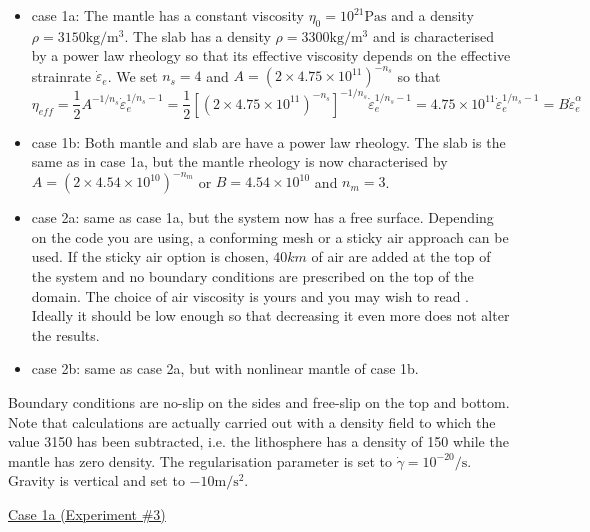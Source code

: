 \begin{itemize}
\item case 1a: 
The mantle has a constant viscosity $\eta_0=10^{21}\si{\pascal\second}$ and a density 
$\rho=3150\si{\kilogram\per\cubic\metre}$. 
The slab has a density $\rho=3300\si{\kilogram\per\cubic\metre}$ 
and is characterised by a power law rheology so that 
its effective viscosity depends on the effective strainrate $\dot\varepsilon_e$.
We set $n_s=4$ and $A=(2 \times 4.75\!\times\! 10^{11})^{-n_s}$ so that 
\begin{equation}
\eta_{eff}
=\frac{1}{2} A^{-1/n_s} \dot\varepsilon_e^{1/n_s-1} 
=\frac{1}{2} [(2 \times 4.75\!\times\! 10^{11})^{-n_s}]^{-1/n_s} \dot\varepsilon_e^{1/n_s-1} 
=4.75\!\times\! 10^{11} \dot\varepsilon_e^{1/n_s-1} 
= B \dot\varepsilon_e^\alpha
\end{equation}

\item case 1b: 
Both mantle and slab are have a power law rheology. 
The slab is the same as in case 1a, but the mantle rheology is now 
characterised by $A=(2 \times 4.54 \!\times\! 10^{10})^{-n_m}$ or $B=4.54 \times 10^{10}$ 
and $n_m=3$.

\item case 2a: same as case 1a, but the system now has a free surface. Depending on the code 
you are using, a conforming mesh or a sticky air approach can be used. If the sticky air option is chosen,
$40km$ of air are added at the top of the system and no boundary conditions are prescribed on 
the top of the domain. The choice of air viscosity is yours and you may wish to read \cite{crsg12}.
Ideally it should be low enough so that decreasing it even more does not alter the results. 

\item case 2b: same as case 2a, but with nonlinear mantle of case 1b. 

\end{itemize}

Boundary conditions are no-slip on the sides and free-slip on the top and bottom. 
Note that calculations are actually carried out with a density field to which the value 3150 has 
been subtracted, i.e. the lithosphere has a density of 150 while the mantle has zero density.
The regularisation parameter is set to $\dot{\gamma}=10^{-20}\si{\per\second}$.
Gravity is vertical and set to $-10\si{\metre\per\square\second}$.

\newpage
\underline{Case 1a (Experiment \#3)}

